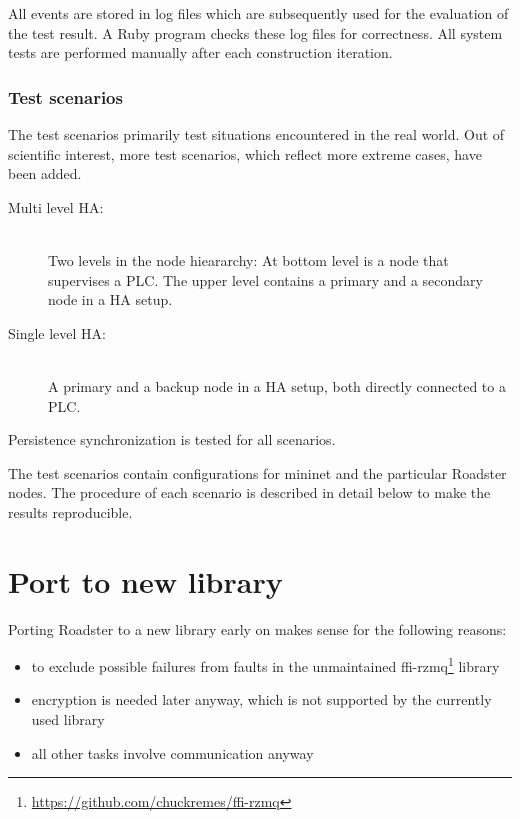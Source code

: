 All events are stored in log files which are subsequently used for the
evaluation of the test result.  A Ruby program checks these log files for
correctness. All system tests are performed manually after each construction
iteration.

\subsubsection{Test scenarios}
The test scenarios primarily test situations encountered in the real world. Out
of scientific interest, more test scenarios, which reflect more extreme cases,
have been added.
\begin{description}
	\item [ Multi level HA: ]\hfill\\
		Two levels in the node hieararchy: At bottom level is a node
		that supervises a \gls{PLC}. The upper level contains a primary
		and a secondary node in a HA setup.
	\item [ Single level HA: ]\hfill\\
		A primary and a backup node in a HA setup, both directly
		connected to a \gls{PLC}.
\end{description}

Persistence synchronization is tested for all scenarios. %

The test scenarios contain configurations for mininet and the particular Roadster nodes.
The procedure of each scenario is described in detail below to make the results reproducible.


\section{Port to new \zmq library}\label{sec:approach:port}
Porting Roadster to a new \zmq library early on makes sense for the following reasons:

\begin{itemize}
\item to exclude possible failures from faults in the unmaintained ffi-rzmq\footnote{\url{https://github.com/chuckremes/ffi-rzmq}} library
\item encryption is needed later anyway, which is not supported by the currently used library
\item all other tasks involve \zmq communication anyway
\end{itemize}

